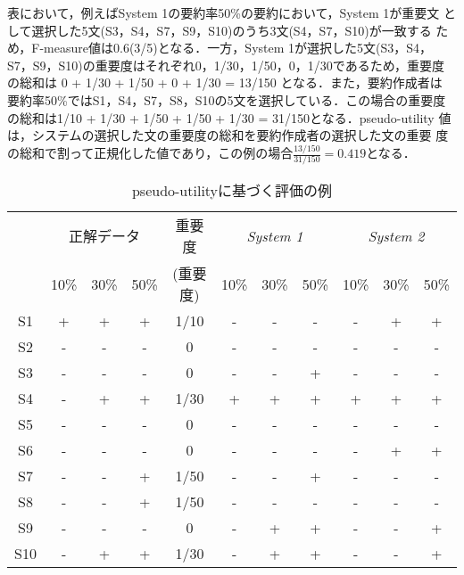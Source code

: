表において，例えばSystem 1の要約率50\%の要約において，System 1が重要文
として選択した5文(S3，S4，S7，S9，S10)のうち3文(S4，S7，S10)が一致する
ため，F-measure値は0.6(3/5)となる．一方，System 1が選択した5文(S3，S4，
S7，S9，S10)の重要度はそれぞれ0，1/30，1/50，0，1/30であるため，重要度
の総和は 0 + 1/30 + 1/50 + 0 + 1/30 = 13/150 となる．また，要約作成者は
要約率50\%ではS1，S4，S7，S8，S10の5文を選択している．この場合の重要度
の総和は1/10 + 1/30 + 1/50 + 1/50 + 1/30 = 31/150となる．pseudo-utility
値は，システムの選択した文の重要度の総和を要約作成者の選択した文の重要
度の総和で割って正規化した値であり，この例の場合$\frac{13/150}{31/150}
= 0.419$となる．

\begin{table}[t]
\caption{pseudo-utilityに基づく評価の例\label{table:exp1}}
\begin{center}
\begin{tabular}{c||c|c|c||c||c|c|c||c|c|c}\hline
    & \multicolumn{3}{c||}{正解データ} & 重要度 & \multicolumn{3}{c||}{\it
 System 1} & \multicolumn{3}{c}{\it System 2}\\\cline{2-4}\cline{6-11}
    & 10\% & 30\% & 50\% & (重要度) & 10\% & 30\% & 50\% & 10\% & 30\% & 50\% \\\hline
S1  &   +  &   +  &   +  & 1/10     &   -  &  -   &  -   &   -  &  +   &  +   \\
S2  &   -  &   -  &   -  & 0        &   -  &  -   &  -   &   -  &  -   &  -   \\
S3  &   -  &   -  &   -  & 0        &   -  &  -   &  +   &   -  &  -   &  -   \\
S4  &   -  &   +  &   +  & 1/30     &   +  &  +   &  +   &   +  &  +   &  +   \\
S5  &   -  &   -  &   -  & 0        &   -  &  -   &  -   &   -  &  -   &  -   \\
S6  &   -  &   -  &   -  & 0        &   -  &  -   &  -   &   -  &  +   &  +   \\
S7  &   -  &   -  &   +  & 1/50     &   -  &  -   &  +   &   -  &  -   &  -   \\
S8  &   -  &   -  &   +  & 1/50     &   -  &  -   &  -   &   -  &  -   &  -   \\
S9  &   -  &   -  &   -  & 0        &   -  &  +   &  +   &   -  &  -   &  +   \\
S10 &   -  &   +  &   +  & 1/30     &   -  &  +   &  +   &   -  &  -   &  +   \\
\end{tabular}
\end{center}
\vspace{0.3cm}

\end{table}
